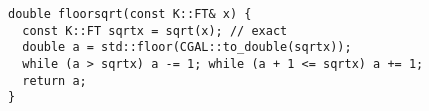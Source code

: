 \documentclass[guide.tex]{subfiles}
\begin{document}
\begin{verbatim}
double floorsqrt(const K::FT& x) {
  const K::FT sqrtx = sqrt(x); // exact
  double a = std::floor(CGAL::to_double(sqrtx));
  while (a > sqrtx) a -= 1; while (a + 1 <= sqrtx) a += 1;
  return a;
}
\end{verbatim}


\begin{verbatim}

\end{verbatim}


\begin{verbatim}

\end{verbatim}
\end{document}
